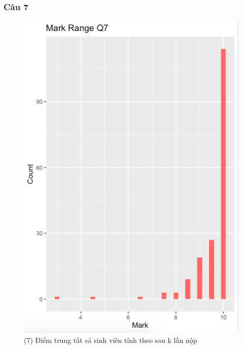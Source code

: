 \documentclass[a4paper]{article}
\theoremstyle{definition}
\begin{document}
\subsubsection{Câu 7}
\begin{figure}[!ht]
    \centering
    \includegraphics[scale=0.4]{Pics/q7-plot1.png}
    \caption{(7) Điểm trung tất cả sinh viên tính theo sau k lần nộp}
    \label{fig:my_label}
\end{figure}
\newpage
\end{document}

